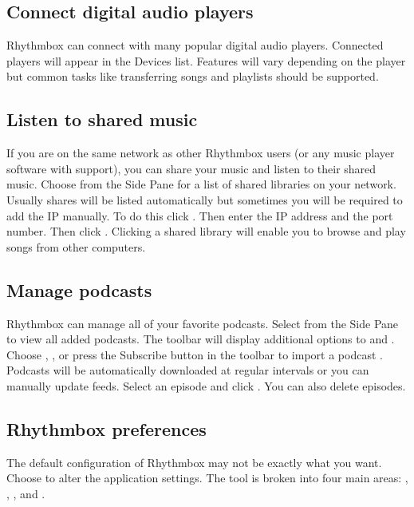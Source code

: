 \subsection{Connect digital audio players}
Rhythmbox can connect with many popular digital audio players. Connected players will appear in the Devices list. Features will vary depending on the player but common tasks like transferring songs and playlists should be supported.

\subsection{Listen to shared music}
If you are on the same network as other Rhythmbox users (or any music player software with  support), you can share your music and listen to their shared music. Choose  from the Side Pane for a list of shared libraries on your network. Usually shares will be listed automatically but sometimes you will be required to add the IP manually. To do this click . Then enter the IP address and the port number. Then click . Clicking a shared library will enable you to browse and play songs from other computers.

\subsection{Manage podcasts}
Rhythmbox can manage all of your favorite podcasts. Select  from the Side Pane to view all added podcasts. The toolbar will display additional options to  and . Choose , , or press the Subscribe button in the toolbar to import a podcast . Podcasts will be automatically downloaded at regular intervals or you can manually update feeds. Select an episode and click . You can also delete episodes.



\subsection{Rhythmbox preferences}
The default configuration of Rhythmbox may not be exactly what you want. Choose  to alter the application settings. The  tool is broken into four main areas: , , , and .

